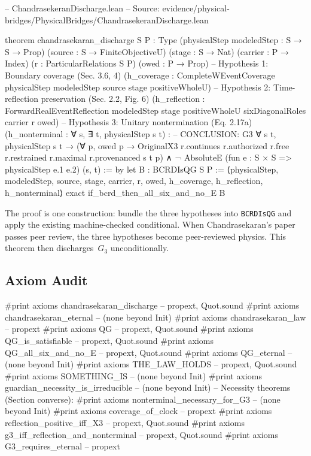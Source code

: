 \documentclass[11pt,a4paper]{article}
\theoremstyle{definition}
\theoremstyle{remark}
\begin{document}
\begin{leancode}
-- ChandrasekeranDischarge.lean
-- Source: evidence/physical-bridges/PhysicalBridges/ChandrasekeranDischarge.lean

theorem chandrasekaran_discharge {S P : Type}
    (physicalStep modeledStep : S → S → Prop)
    (source : S → FiniteObjectiveU)
    (stage : S → Nat)
    (carrier : P → Index)
    (r : ParticularRelations S P)
    (owed : P → Prop)
    -- Hypothesis 1: Boundary coverage (Sec. 3.6, 4)
    (h_coverage : CompleteWEventCoverage physicalStep modeledStep
      source stage positiveWholeU)
    -- Hypothesis 2: Time-reflection preservation (Sec. 2.2, Fig. 6)
    (h_reflection : ForwardRealEventReflection modeledStep stage
      positiveWholeU sixDiagonalRoles carrier r owed)
    -- Hypothesis 3: Unitary nontermination (Eq. 2.17a)
    (h_nonterminal : ∀ s, ∃ t, physicalStep s t) :
    -- CONCLUSION: G3
    ∀ s t, physicalStep s t →
      (∀ p, owed p →
        OriginalX3 r.continues r.authorized r.free
          r.restrained r.maximal r.provenanced s t p) ∧
      ¬ AbsoluteE
        (fun e : S × S => physicalStep e.1 e.2) (s, t) := by
  let B : BCRDIsQG S P := ⟨physicalStep, modeledStep, source, stage,
    carrier, r, owed, h_coverage, h_reflection, h_nonterminal⟩
  exact if_bcrd_then_all_six_and_no_E B
\end{leancode}

The proof is one construction: bundle the three hypotheses into \texttt{BCRDIsQG} and apply the existing machine-checked conditional. When Chandrasekaran's paper passes peer review, the three hypotheses become peer-reviewed physics. This theorem then discharges~$G_3$ unconditionally.

\subsection{Axiom Audit}

\begin{leancode}
#print axioms chandrasekaran_discharge     -- propext, Quot.sound
#print axioms chandrasekaran_eternal       -- (none beyond Init)
#print axioms chandrasekaran_law           -- propext
#print axioms QG                           -- propext, Quot.sound
#print axioms QG_is_satisfiable            -- propext, Quot.sound
#print axioms QG_all_six_and_no_E          -- propext, Quot.sound
#print axioms QG_eternal                   -- (none beyond Init)
#print axioms THE_LAW_HOLDS                -- propext, Quot.sound
#print axioms SOMETHING_IS                 -- (none beyond Init)
#print axioms guardian_necessity_is_irreducible  -- (none beyond Init)
-- Necessity theorems (Section converse):
#print axioms nonterminal_necessary_for_G3       -- (none beyond Init)
#print axioms coverage_of_clock                  -- propext
#print axioms reflection_positive_iff_X3         -- propext, Quot.sound
#print axioms g3_iff_reflection_and_nonterminal  -- propext, Quot.sound
#print axioms G3_requires_eternal                -- propext
\end{leancode}
\end{document}
